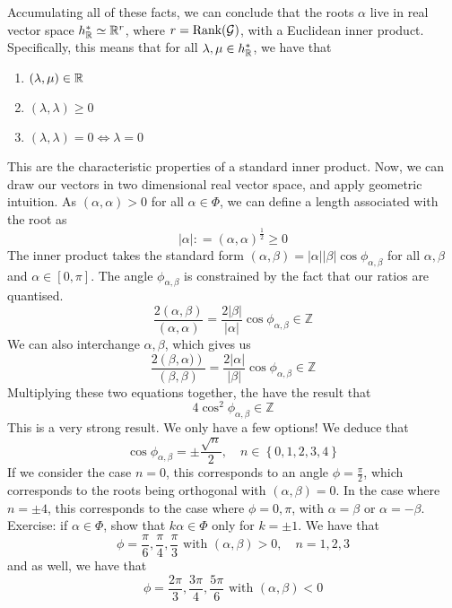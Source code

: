 Accumulating all of these facts, 
we can conclude that the roots $ \alpha $ 
live in real vector space $ h ^ * _{ \mathbb{R} } \simeq \mathbb{R} ^ r $, 
where $ r = \text{Rank}( \mathcal{ G } ) $, with 
a Euclidean inner product. Specifically, this 
means that for all $ \lambda , \mu \in h ^ * _{ \mathbb{R} }  $, 
we have that 
\begin{enumerate}
\item $ ( \lambda , \mu ) \in \mathbb{R} $  
\item $ \left(  \lambda , \lambda  \right)  \geq 0 $
\item $ \left(  \lambda , \lambda  \right)   =0 \iff \lambda  = 0 $ 
\end{enumerate}
This are the characteristic properties of 
a standard inner product. 
Now, we can draw our vectors in two dimensional real 
vector space, and apply geometric intuition. 
As $\left(  \alpha, \alpha  \right)  > 0  $ for all $ \alpha \in \Phi   $, 
we can define a length associated with the 
root as 
\[
| \alpha | : = ( \alpha , \alpha ) ^{ \frac{1}{2 } } \geq 0 
\] 
The inner product takes the standard form 
$ \left(  \alpha, \beta  \right)   = | \alpha | | \beta | 
\cos \phi_{ \alpha, \beta } $  for all $ \alpha , \beta $ and 
$ \alpha \in [ 0 , \pi ] $.
The angle  $ \phi_{ \alpha ,\beta } $ is constrained by the fact that 
our ratios are quantised. 
\[
\frac{ 2 \left(  \alpha, \beta  \right)  }{ ( \alpha , \alpha ) } 
= \frac{2 | \beta | }{ | \alpha | } \cos \phi_{ \alpha , \beta } \in \mathbb{ Z} 
\] We can also interchange $ \alpha , \beta $, which gives us 
\[
\frac{ 2 \left(  \beta , \alpha )  \right)  }{ \left(  
\beta , \beta \right)  } = \frac{ 2 | \alpha | }{ | \beta |  } 
\cos \phi_{ \alpha , \beta } \in \mathbb{ Z} 
\]  Multiplying these two equations together, 
the have the result that 
\[
4 \cos ^ 2 \phi_{ \alpha ,\beta } \in \mathbb{ Z} 
\] This is a very strong result. 
We only have a few options! We deduce that 
\[
\cos \phi_{ \alpha, \beta }  = \pm \frac{\sqrt{ n }  }{ 2 } , \quad 
n \in \left\{  0 , 1, 2, 3, 4 \right\} 
\] If we consider the case $ n = 0 $, this 
corresponds to an angle $ \phi = \frac{ \pi }{ 2 } $, 
which corresponds to the roots being orthogonal with 
$ \left(  \alpha, \beta  \right)   = 0 $. 
In the case where $ n = \pm 4 $, this corresponds 
to the case where $ \phi = 0 , \pi $, with $ \alpha = \beta $ or 
$ \alpha =  - \beta $.
Exercise: if $ \alpha \in \Phi $, show that 
$ k \alpha \in \Phi $ only for $ k  =\pm 1 $. 
We have that 
\[
\phi = \frac{\pi }{ 6 } , \frac{\pi}{ 4 }, \frac{\pi}{ 3 } \text{ with } ( \alpha , \beta ) > 0 , \quad n = 1 , 2,  3 
\] 
and as well, we have that 
\[
\phi = \frac{ 2 \pi }{ 3 } , \frac{ 3 \pi }{ 4 } , \frac{ 5 \pi }{ 6 } \text{ with } \left( \alpha, \beta  \right) < 0 
\] 
